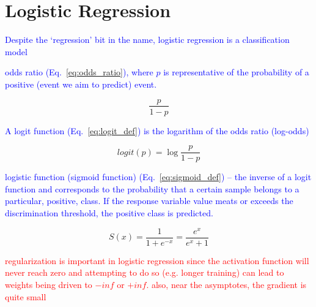 \section{Logistic Regression}

\textcolor{blue}{Despite the `regression' bit in the name, logistic regression is a classification model}

\textcolor{blue}{odds ratio (Eq.~\ref{eq:odds_ratio}), where $p$ is representative of the probability of a positive (event we aim to predict) event.}

\begin{equation}
{\frac{p}{1-p}}
\label{eq:odds_ratio}
\end{equation}

\textcolor{blue}{A logit function (Eq.~\ref{eq:logit_def}) is the logarithm of the odds ratio (log-odds)}

\begin{equation}
{logit(p)=\log{\frac{p}{1-p}}}
\label{eq:logit_def}
\end{equation}

\textcolor{blue}{logistic function (sigmoid function) (Eq.~\ref{eq:sigmoid_def}) -- the inverse of a logit function and corresponds to the probability that a certain sample belongs to a particular, positive, class. If the response variable value meats or exceeds the {discrimination threshold}, the positive class is predicted.}

\begin{equation}
{S(x)={\frac{1}{1+e^{-x}}}={\frac{e^x}{e^x+1}}}
\label{eq:sigmoid_def}
\end{equation}

\textcolor{red}{regularization is important in logistic regression since the activation function will never reach zero and attempting to do so (e.g. longer training) can lead to weights being driven to $-inf$ or $+inf$. also, near the asymptotes, the gradient is quite small}
